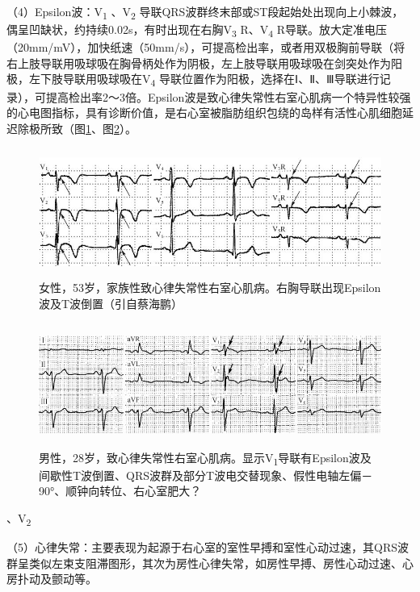（4）Epsilon波：V\textsubscript{1} 、V\textsubscript{2}
导联QRS波群终末部或ST段起始处出现向上小棘波，偶呈凹缺状，约持续0.02s，有时出现在右胸V\textsubscript{3}
R、V\textsubscript{4}
R导联。放大定准电压（20mm/mV），加快纸速（50mm/s），可提高检出率，或者用双极胸前导联（将右上肢导联用吸球吸在胸骨柄处作为阴极，左上肢导联用吸球吸在剑突处作为阳极，左下肢导联用吸球吸在V\textsubscript{4}
导联位置作为阳极，选择在Ⅰ、Ⅱ、Ⅲ导联进行记录），可提高检出率2～3倍。Epsilon波是致心律失常性右室心肌病一个特异性较强的心电图指标，具有诊断价值，是右心室被脂肪组织包绕的岛样有活性心肌细胞延迟除极所致（图\ref{fig43-4}、图\ref{fig43-5}）。

\begin{figure}[!htbp]
 \centering
 \includegraphics[width=5.20833in,height=1.65625in]{./images/Image00707.jpg}
 \captionsetup{justification=centering}
 \caption{女性，53岁，家族性致心律失常性右室心肌病。右胸导联出现Epsilon波及T波倒置（引自蔡海鹏）}
 \label{fig43-4}
  \end{figure} 

\begin{figure}[!htbp]
 \centering
 \includegraphics[width=5.58333in,height=1.59375in]{./images/Image00708.jpg}
 \captionsetup{justification=centering}
 \caption{男性，28岁，致心律失常性右室心肌病。显示V\textsubscript{1}导联有Epsilon波及间歇性T波倒置、QRS波群及部分T波电交替现象、假性电轴左偏－90°、顺钟向转位、右心室肥大？}
 \label{fig43-5}
  \end{figure} 
、V\textsubscript{2}


（5）心律失常：主要表现为起源于右心室的室性早搏和室性心动过速，其QRS波群呈类似左束支阻滞图形，其次为房性心律失常，如房性早搏、房性心动过速、心房扑动及颤动等。

